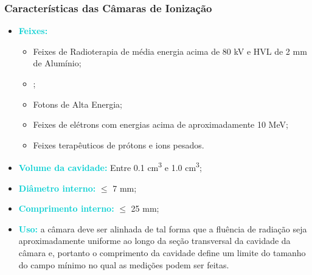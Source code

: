 \documentclass[11pt,a4paper]{article}
\newcounter{exemplo}
\begin{document}
	\subsubsection*{Características das Câmaras de Ionização}

	\begin{exemplo}
		\begin{itemize}[label=\textcolor{CarnationPink}{$\blacktriangleright$}]
			\item \textcolor{DarkTurquoise}{\LobsterTwo\textbf{Feixes:}}
				\begin{itemize}[label=\textcolor{CarnationPink}{$\star$}]
					\item Feixes de Radioterapia de média energia acima de 80 kV e HVL de 2 mm de Alumínio;
					\item {};
					\item Fotons de Alta Energia;
					\item Feixes de elétrons com energias acima de aproximadamente 10 MeV;
					\item Feixes terapêuticos de prótons e ions pesados.
				\end{itemize}
			\item \textcolor{DarkTurquoise}{\LobsterTwo\textbf{Volume da cavidade:}} Entre 0.1 \unit{cm^3} e 1.0 \unit{cm^3};
			\item \textcolor{DarkTurquoise}{\LobsterTwo\textbf{Diâmetro interno:}} $\leq$ 7 mm;
			\item \textcolor{DarkTurquoise}{\LobsterTwo\textbf{Comprimento interno:}} $\leq$ 25 mm;
			\item \textcolor{DarkTurquoise}{\LobsterTwo\textbf{Uso:}} a câmara deve ser alinhada de tal forma que a fluência de radiação seja aproximadamente uniforme ao longo da seção transversal da cavidade da câmara e, portanto o comprimento da cavidade  define um limite do tamanho do campo mínimo no qual as medições podem ser feitas.
		\end{itemize}		 
	\end{exemplo}
\end{document}
